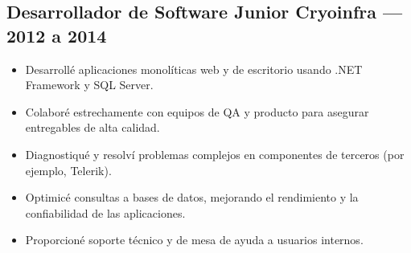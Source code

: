 \subsection*{Desarrollador de Software Junior \hfill Cryoinfra — 2012 a 2014}
\begin{itemize}[leftmargin=12pt]
    \item Desarrollé aplicaciones monolíticas web y de escritorio usando .NET Framework y SQL Server.
    \item Colaboré estrechamente con equipos de QA y producto para asegurar entregables de alta calidad.
    \item Diagnostiqué y resolví problemas complejos en componentes de terceros (por ejemplo, Telerik).
    \item Optimicé consultas a bases de datos, mejorando el rendimiento y la confiabilidad de las aplicaciones.
    \item Proporcioné soporte técnico y de mesa de ayuda a usuarios internos.
\end{itemize}
